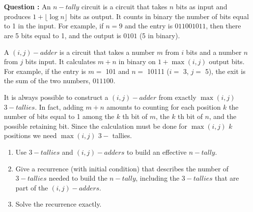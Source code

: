 \documentclass[11pt]{article} %
\newenvironment{question}[1][\unskip]{%
	\par
	\noindent
	\textbf{Question #1:}
	\noindent}
{\medskip}
\begin{document}
	\section{}
	\begin{question}
		An $ n-tally $ circuit is a circuit that takes $ n $ bits as input and produces $ 1 + \lfloor \log n \rfloor $ bits as output. It counts in binary the number of bits equal to 1 in the input. For example, if $ n = 9 $ and the entry is $ 011001011 $, then there are 5 bits equal to 1, and the output is $ 0101 $ (5 in binary).

		A $ (i, j) -adder $ is a circuit that takes a number $ m $ from $ i $ bits and a number $ n $ from $ j $ bits input. It calculates $ m + n $ in binary on $ 1 + \max (i, j) $ output bits. For example, if the entry is $ m = $ 101 and $ n = $ 10111 ($ i = $ 3, $ j = $ 5), the exit is the sum of the two numbers, $ 011100 $.

		It is always possible to construct a $ (i, j) -adder $ from exactly $ \max (i, j) $ $ 3-tallies $. In fact, adding $ m + n $ amounts to counting for each position $ k $ the number of bits equal to 1 among the $ k $ th bit of $ m $, the $ k $ th bit of $ n $, and the possible retaining bit. Since the calculation must be done for $ \max (i, j) $ $ k $ positions we need $ \max (i, j) $ $ 3-$ tallies.

		\begin{enumerate}
			\item {Use $ 3-tallies $ and $ (i, j) -adders $ to build an effective $ n-tally $.}
			\item{Give a recurrence (with initial condition) that describes the number of $ 3-tallies $ needed to build the $ n-tally $, including the $ 3-tallies $ that are part of the $ (i, j) -adders $.}
			\item{Solve the recurrence exactly.}
		\end{enumerate}
	\end{question}
\end{document}
